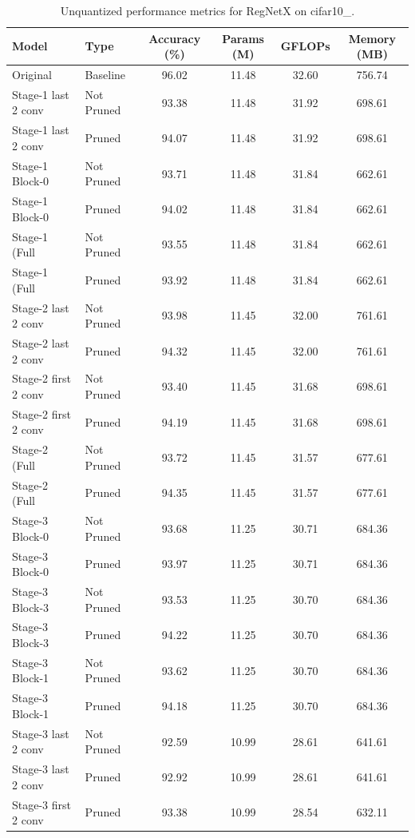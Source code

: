 \begin{table}
\caption{Unquantized performance metrics for RegNetX on cifar10_.}
\label{tab:RegNetX_cifar10__unquant}
\begin{tabular}{llcccc}
\toprule
Model & Type & Accuracy (\%) & Params (M) & GFLOPs & Memory (MB) \\
\midrule
Original & Baseline & 96.02 & 11.48 & 32.60 & 756.74 \\
Stage-1 last 2 conv & Not Pruned & 93.38 & 11.48 & 31.92 & 698.61 \\
Stage-1 last 2 conv & Pruned & 94.07 & 11.48 & 31.92 & 698.61 \\
Stage-1 Block-0 & Not Pruned & 93.71 & 11.48 & 31.84 & 662.61 \\
Stage-1 Block-0 & Pruned & 94.02 & 11.48 & 31.84 & 662.61 \\
Stage-1 (Full & Not Pruned & 93.55 & 11.48 & 31.84 & 662.61 \\
Stage-1 (Full & Pruned & 93.92 & 11.48 & 31.84 & 662.61 \\
Stage-2 last 2 conv & Not Pruned & 93.98 & 11.45 & 32.00 & 761.61 \\
Stage-2 last 2 conv & Pruned & 94.32 & 11.45 & 32.00 & 761.61 \\
Stage-2 first 2 conv & Not Pruned & 93.40 & 11.45 & 31.68 & 698.61 \\
Stage-2 first 2 conv & Pruned & 94.19 & 11.45 & 31.68 & 698.61 \\
Stage-2 (Full & Not Pruned & 93.72 & 11.45 & 31.57 & 677.61 \\
Stage-2 (Full & Pruned & 94.35 & 11.45 & 31.57 & 677.61 \\
Stage-3 Block-0 & Not Pruned & 93.68 & 11.25 & 30.71 & 684.36 \\
Stage-3 Block-0 & Pruned & 93.97 & 11.25 & 30.71 & 684.36 \\
Stage-3 Block-3 & Not Pruned & 93.53 & 11.25 & 30.70 & 684.36 \\
Stage-3 Block-3 & Pruned & 94.22 & 11.25 & 30.70 & 684.36 \\
Stage-3 Block-1 & Not Pruned & 93.62 & 11.25 & 30.70 & 684.36 \\
Stage-3 Block-1 & Pruned & 94.18 & 11.25 & 30.70 & 684.36 \\
Stage-3 last 2 conv & Not Pruned & 92.59 & 10.99 & 28.61 & 641.61 \\
Stage-3 last 2 conv & Pruned & 92.92 & 10.99 & 28.61 & 641.61 \\
Stage-3 first 2 conv & Pruned & 93.38 & 10.99 & 28.54 & 632.11 \\

\end{tabular}
\end{table}
